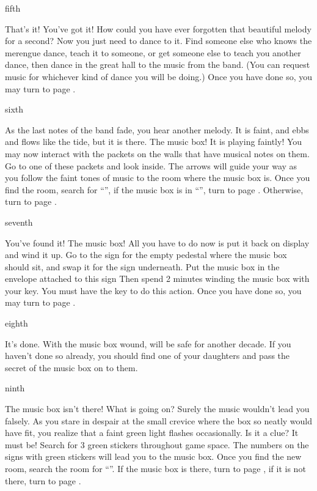 \documentclass[greennotebook]{NeptuneBall}
\begin{document}
\begin{page}{fifth}

That's it! You've got it! How could you have ever forgotten that beautiful melody for a second? Now you just need to dance to it. Find someone else who knows the merengue dance, teach it to someone, or get someone else to teach you another dance, then dance in the great hall to the music from the band. (You can request music for whichever kind of dance you will be doing.) Once you have done so, you may turn to page .

\end{page}

\begin{page}{sixth}

As the last notes of the band fade, you hear another melody. It is faint, and ebbs and flows like the tide, but it is there. The music box! It is playing faintly! You may now interact with the packets on the walls that have musical notes on them. Go to one of these packets and look inside. The arrows will guide your way as you follow the faint tones of music to the room where the music box is. Once you find the room, search for ``\sPacketA{}'', if the music box is in ``\sPacketA{}'', turn to page . Otherwise, turn to page .

\end{page}

\begin{page}{seventh}

You've found it! The music box! All you have to do now is put it back on display and wind it up. Go to the sign for the empty pedestal where the music box should sit, and swap it for the sign underneath. Put the music box in the envelope attached to this sign Then spend 2 minutes winding the music box with your key. You must have the key to do this action. Once you have done so, you may turn to page .

\end{page}

\begin{page}{eighth}

It's done. With the music box wound, \pAtlantis{} will be safe for another decade. If you haven't done so already, you should find one of your daughters and pass the secret of the music box on to them.

\end{page}

\begin{page}{ninth}

The music box isn't there! What is going on? Surely the music wouldn't lead you falsely. As you stare in despair at the small crevice where the box so neatly would have fit, you realize that a faint green light flashes occasionally. Is it a clue? It must be!  Search for 3 green stickers throughout game space. The numbers on the signs with green stickers will lead you to the music box. Once you find the new room, search the room for ``\sPacketB{}''. If the music box is there, turn to page , if it is not there, turn to page .

\end{page}
\end{document}
